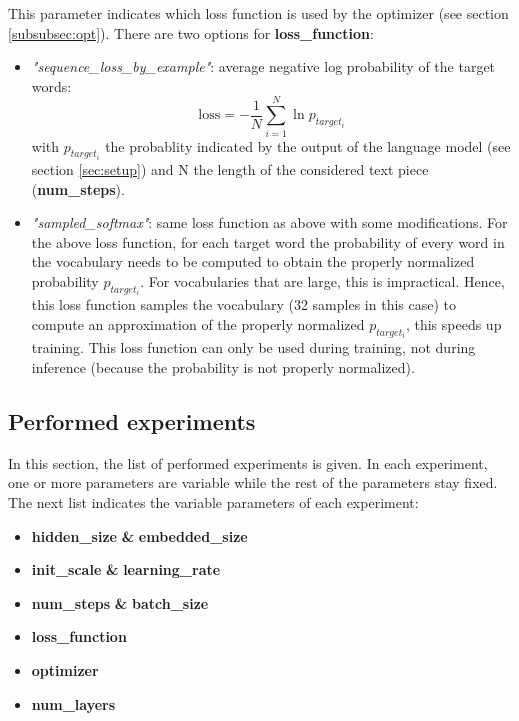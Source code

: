\documentclass[10pt,a4paper,titlepage]{article}
\begin{document}
This parameter indicates which loss function is used by the optimizer (see section \ref{subsubsec:opt}). There are two options for \textbf{loss\_function}:

\begin{itemize}
	
	\item \textit{"sequence\_loss\_by\_example"}: average negative log probability of the target words:
	\[ \text{loss} = -\frac{1}{N} \sum_{i=1}^{N} \ln p_{target_{i}} \]
	\noindent
	with $p_{target_{i}}$ the probablity indicated by the output of the language model (see section \ref{sec:setup}) and N the length of the considered text piece (\textbf{num\_steps}).
	
	\item \textit{"sampled\_softmax"}: same loss function as above with some modifications. For the above loss function, for each target word the probability of every word in the vocabulary needs to be computed to obtain  the properly normalized probability $p_{target_{i}}$. For vocabularies that are large, this is impractical. Hence, this loss function samples the vocabulary (32 samples in this case) to compute an approximation of the properly normalized $p_{target_{i}}$, this speeds up training. This loss function can only be used during training, not during inference (because the probability is not properly normalized).
	
\end{itemize}

\subsection{Performed experiments}
\label{subsec:perf}

In this section, the list of performed experiments is given. In each experiment, one or more parameters are variable while the rest of the parameters stay fixed. The next list indicates the variable parameters of each experiment:

\begin{itemize}
	
	\item \textbf{hidden\_size} \textbf{\&} \textbf{embedded\_size}
	\item \textbf{init\_scale} \textbf{\&} \textbf{learning\_rate}
	\item \textbf{num\_steps} \textbf{\&} \textbf{batch\_size}
	\item \textbf{loss\_function}
	\item \textbf{optimizer}
	\item \textbf{num\_layers}
	
\end{itemize}
\end{document}
